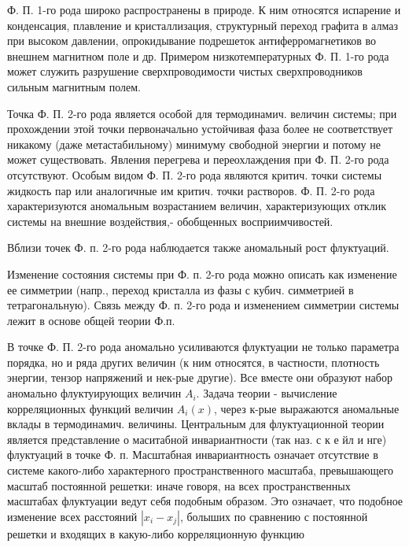 \documentclass[10pt]{article}
\begin{document}
Ф. П. 1-го рода широко распространены в природе. К ним относятся испарение и конденсация, плавление и кристаллизация, структурный переход графита в алмаз при высоком давлении, опрокидывание подрешеток антиферромагнетиков во внешнем магнитном поле и др. Примером низкотемпературных Ф. П. 1-го рода может служить разрушение сверхпроводимости чистых сверхпроводников сильным магнитным полем.



Точка Ф. П. 2-го рода является особой для термодинамич. величин системы; при прохождении этой точки первоначально устойчивая фаза более не соответствует никакому (даже метастабильному) минимуму свободной энергии и потому не может существовать. Явления перегрева и переохлаждения при Ф. П. 2-го рода отсутствуют. Особым видом Ф. П. 2-го рода являются критич. точки системы жидкость пар или аналогичные им критич. точки растворов. Ф. П. 2-го рода характеризуются аномальным возрастанием величин, характеризующих отклик системы на внешние воздействия,- обобщенных восприимчивостей.



Вблизи точек Ф. п. 2-го рода наблюдается также аномальный рост флуктуаций.



Изменение состояния системы при Ф. п. 2-го рода можно описать как изменение ее симметрии (напр., переход кристалла из фазы с кубич. симметрией в тетрагональную). Связь между Ф. п. 2-го рода и изменением симметрии системы лежит в основе общей теории Ф.п.



В точке Ф. П. 2-го рода аномально усиливаются флуктуации не только параметра порядка, но и ряда других величин (к ним относятся, в частности, плотность энергии, тензор напряжений и нек-рые другие). Все вместе они образуют набор аномально флуктуирующих величин $A_{i}$. Задача теории - вычисление корреляционных функций величин $A_{i}(x)$, через к-рые выражаются аномальные вклады в термодинамич. величины. Центральным для флуктуационной теории является представление о маситабной инвариантности (так наз. с к е йл и нге) флуктуаций в точке Ф. п. Масштабная инвариантность означает отсутствие в системе какого-либо характерного пространственного масштаба, превышающего масштаб постоянной решетки: иначе говоря, на всех пространственных масштабах флуктуации ведут себя подобным образом. Это означает, что подобное изменение всех расстояний $\left|x_{i}-x_{j}\right|$, болыших по сравнению с постоянной решетки и входящих в какую-либо корреляционную функцию
\end{document}
